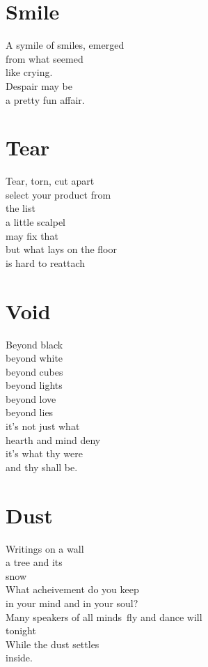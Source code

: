 \documentclass[a4paper,twoside, openany]{book}
\newenvironment{Verse}
  {\center\varwidth{\linewidth}\fontsize{18}{21.6}\selectfont}
  {\endvarwidth\endcenter}
\begin{document}
\chapter{Smile}
\begin{Verse}
    A symile of smiles, emerged\\
    from what seemed\\
    like crying.\\
    Despair may be\\
    a pretty fun affair.
\end{Verse}

\chapter{Tear}
\begin{Verse}
    Tear, torn, cut apart\\
    select your product from\\
    the list\\
    a little scalpel\\
    may fix that\\
    but what lays on the floor\\
    is hard to reattach 
\end{Verse}

\chapter{Void}
\begin{Verse}
    Beyond black\\
    beyond white\\ 
    beyond cubes\\
    beyond lights\\
    beyond love\\
    beyond lies\\
    it's not just what\\
    hearth and mind deny\\
    it's what thy were\\
    and thy shall be.
\end{Verse}

\chapter{Dust}
\begin{Verse}
    Writings on a wall\\
    a tree and its\\
    snow\\
    What acheivement do you keep\\
    in your mind and in your soul?\\
    Many speakers of all minds\
    fly and dance will\\
    tonight\\
    While the dust settles\\
    inside.
\end{Verse}
\end{document}
